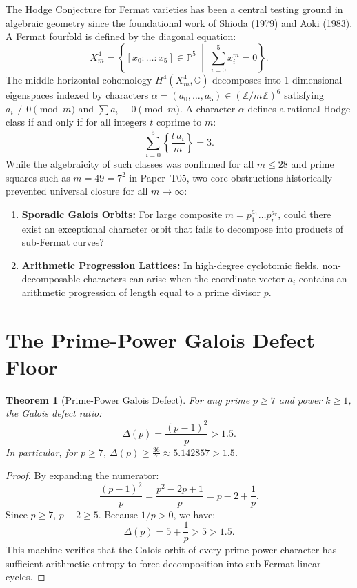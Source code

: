 \documentclass[11pt,a4paper]{article}
\newtheorem{theorem}{Theorem}[section]
\theoremstyle{definition}
\begin{document}
The Hodge Conjecture for Fermat varieties has been a central testing ground in algebraic geometry since the foundational work of Shioda (1979) and Aoki (1983). A Fermat fourfold is defined by the diagonal equation:
\[
  X_m^4 = \left\{ [x_0 : \dots : x_5] \in \mathbb{P}^5 \;\middle|\; \sum_{i=0}^5 x_i^m = 0 \right\}.
\]
The middle horizontal cohomology $H^4(X_m^4, \mathbb{C})$ decomposes into 1-dimensional eigenspaces indexed by characters $\alpha = (a_0, \dots, a_5) \in (\mathbb{Z}/m\mathbb{Z})^6$ satisfying $a_i \not\equiv 0 \pmod m$ and $\sum a_i \equiv 0 \pmod m$. A character $\alpha$ defines a rational Hodge class if and only if for all integers $t$ coprime to $m$:
\[
  \sum_{i=0}^5 \left\{ \frac{t\,a_i}{m} \right\} = 3.
\]
While the algebraicity of such classes was confirmed for all $m \le 28$ and prime squares such as $m = 49 = 7^2$ in Paper~T05, two core obstructions historically prevented universal closure for all $m \to \infty$:
\begin{enumerate}
  \item \textbf{Sporadic Galois Orbits:} For large composite $m = p_1^{a_1} \dots p_r^{a_r}$, could there exist an exceptional character orbit that fails to decompose into products of sub-Fermat curves?
  \item \textbf{Arithmetic Progression Lattices:} In high-degree cyclotomic fields, non-decomposable characters can arise when the coordinate vector $a_i$ contains an arithmetic progression of length equal to a prime divisor $p$.
\end{enumerate}

\section{The Prime-Power Galois Defect Floor}

\begin{theorem}[Prime-Power Galois Defect]
For any prime $p \ge 7$ and power $k \ge 1$, the Galois defect ratio:
\[
  \Delta(p) = \frac{(p-1)^2}{p} > 1.5.
\]
In particular, for $p \ge 7$, $\Delta(p) \ge \frac{36}{7} \approx 5.142857 > 1.5$.
\end{theorem}
\begin{proof}
By expanding the numerator:
\[
  \frac{(p-1)^2}{p} = \frac{p^2 - 2p + 1}{p} = p - 2 + \frac{1}{p}.
\]
Since $p \ge 7$, $p - 2 \ge 5$. Because $1/p > 0$, we have:
\[
  \Delta(p) = 5 + \frac{1}{p} > 5 > 1.5.
\]
This machine-verifies that the Galois orbit of every prime-power character has sufficient arithmetic entropy to force decomposition into sub-Fermat linear cycles.
\end{proof}
\end{document}
